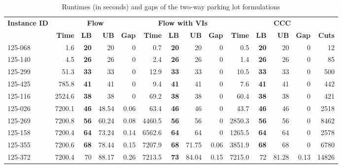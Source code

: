 \documentclass[10pt]{article}
\theoremstyle{definition}
\begin{document}
\begin{table}[H]
\small
  \centering
  \caption{Runtimes (in seconds) and gaps of the two-way parking lot formulations}
    \begin{tabular}{l|rrrr|rrrr|rrrrr}
    \hline
    \multicolumn{1}{r|}{\multirow{2}[4]{*}{\textbf{Instance ID}}} & \multicolumn{4}{c|}{\textbf{Flow }} & \multicolumn{4}{c|}{\textbf{Flow  with VIs}} & \multicolumn{5}{c}{\textbf{CCC}} \\
\cline{2-14}          & \textbf{Time} & \textbf{LB} & \textbf{UB} & \textbf{Gap} & \textbf{Time} & \textbf{LB} & \textbf{UB} & \textbf{Gap} & \textbf{Time} & \textbf{LB} & \textbf{UB} & \textbf{Gap} & \textbf{Cuts} \\
        \hline
    125-068 & 1.6   & \textbf{20} & 20    & 0     & 0.7   & \textbf{20} & 20    & 0     & 0.5   & \textbf{20} & 20    & 0     & 12 \\
    125-140 & 4.5   & \textbf{26} & 26    & 0     & 2.4   & \textbf{26} & 26    & 0     & 1.4   & \textbf{26} & 26    & 0     & 85 \\
    125-299 & 51.3  & \textbf{33} & 33    & 0     & 12.9  & \textbf{33} & 33    & 0     & 10.5  & \textbf{33} & 33    & 0     & 500 \\
    125-425 & 785.8 & \textbf{41} & 41    & 0     & 9.4   & \textbf{41} & 41    & 0     & 7.6   & \textbf{41} & 41    & 0     & 442 \\
    125-116 & 2524.6 & \textbf{38} & 38    & 0     & 69.2  & \textbf{38} & 38    & 0     & 60.4  & \textbf{38} & 38    & 0     & 421 \\
    125-026 & 7200.1 & \textbf{46} & 48.54 & 0.06  & 63.4  & \textbf{46} & 46    & 0     & 43.7  & \textbf{46} & 46    & 0     & 2518 \\
    125-269 & 7200.8 & \textbf{56} & 60.24 & 0.08  & 4460.5 & \textbf{56} & 56    & 0     & 2850.3 & \textbf{56} & 56    & 0     & 8462 \\
    125-158 & 7200.4 & \textbf{64} & 73.24 & 0.14  & 6562.6 & \textbf{64} & 64    & 0     & 1265.5 & \textbf{64} & 64    & 0     & 2578 \\
    125-355 & 7200.6 & \textbf{68} & 78.44 & 0.15  & 7207.9 & \textbf{68} & 71.75 & 0.06  & 3851.9 & \textbf{68} & 68    & 0     & 6780 \\
    125-372 & 7200.4 & 70    & 88.17 & 0.26  & 7213.5 & \textbf{73} & 84.04 & 0.15  & 7215.0 & 72    & 81.28 & 0.13  & 14826 \\

\end{tabular}
\end{table}
\end{document}
